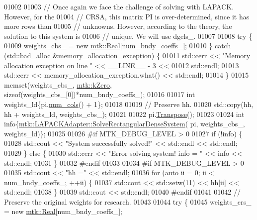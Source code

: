 \begin{DoxyCode}
{{01002 
01003   \textcolor{comment}{// Once again we face the challenge of solving with LAPACK. However, for the}
01004   \textcolor{comment}{// CRSA, this matrix PI is over-determined, since it has more rows than}
01005   \textcolor{comment}{// unknowns. However, according to the theory, the solution to this system is}
01006   \textcolor{comment}{// unique. We will use dgels\_.}
01007 
01008   \textcolor{keywordflow}{try} \{
01009     weights\_cbs\_ = \textcolor{keyword}{new} \hyperlink{group__c01-roots_gac080bbbf5cbb5502c9f00405f894857d}{mtk::Real}[num\_bndy\_coeffs\_];
01010   \} \textcolor{keywordflow}{catch} (std::bad\_alloc &memory\_allocation\_exception) \{
01011     std::cerr << \textcolor{stringliteral}{"Memory allocation exception on line "} << \_\_LINE\_\_ - 3 <<
01012       std::endl;
01013     std::cerr << memory\_allocation\_exception.what() << std::endl;
01014   \}
01015   memset(weights\_cbs\_, \hyperlink{group__c01-roots_ga59a451a5fae30d59649bcda274fea271}{mtk::kZero}, \textcolor{keyword}{sizeof}(weights\_cbs\_[0])*num\_bndy\_coeffs\_);
01016 
01017   \textcolor{keywordtype}{int} weights\_ld\{pi.\hyperlink{classmtk_1_1DenseMatrix_af6f78373aaf2136f0c78974d7c8de0a8}{num\_cols}() + 1\};
01018 
01019   \textcolor{comment}{// Preserve hh.}
01020   std::copy(hh, hh + weights\_ld, weights\_cbs\_);
01021 
01022   pi.\hyperlink{classmtk_1_1DenseMatrix_a71d9c07ca66e88d97d1fd5012f43138b}{Transpose}();
01023 
01024   \textcolor{keywordtype}{int} info\{\hyperlink{classmtk_1_1LAPACKAdapter_a380f148ffdf96bae2f79ae28f1a6560c}{mtk::LAPACKAdapter::SolveRectangularDenseSystem}(
      pi, weights\_cbs\_, weights\_ld)\};
01025 
01026 \textcolor{preprocessor}{  #if MTK\_DEBUG\_LEVEL > 0}
01027   \textcolor{keywordflow}{if} (!info) \{
01028     std::cout << \textcolor{stringliteral}{"System successfully solved!"} << std::endl << std::endl;
01029   \} \textcolor{keywordflow}{else} \{
01030     std::cerr << \textcolor{stringliteral}{"Error solving system! info = "} << info << std::endl;
01031   \}
01032 \textcolor{preprocessor}{  #endif}
01033 
01034 \textcolor{preprocessor}{  #if MTK\_DEBUG\_LEVEL > 0}
01035   std::cout << \textcolor{stringliteral}{"hh ="} << std::endl;
01036   \textcolor{keywordflow}{for} (\textcolor{keyword}{auto} ii = 0; ii < num\_bndy\_coeffs\_; ++ii) \{
01037     std::cout << std::setw(11) << hh[ii] << std::endl;
01038   \}
01039   std::cout << std::endl;
01040 \textcolor{preprocessor}{  #endif}
01041 
01042   \textcolor{comment}{// Preserve the original weights for research.}
01043 
01044   \textcolor{keywordflow}{try} \{
01045     weights\_crs\_ = \textcolor{keyword}{new} \hyperlink{group__c01-roots_gac080bbbf5cbb5502c9f00405f894857d}{mtk::Real}[num\_bndy\_coeffs\_];
}}
\end{DoxyCode}
